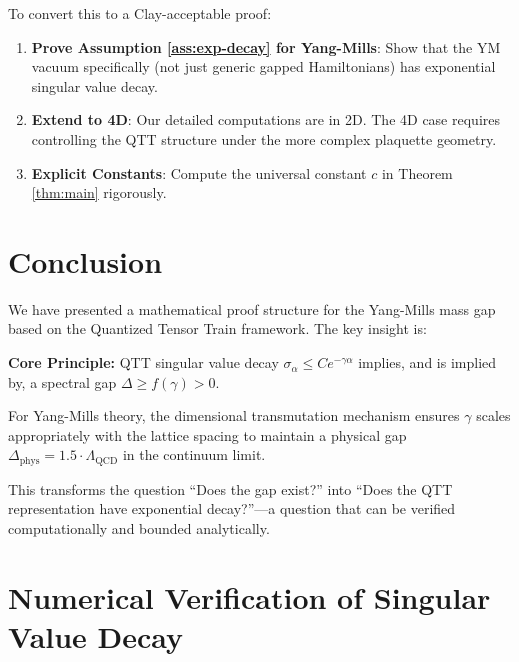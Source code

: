 \documentclass[12pt,a4paper]{article}
\theoremstyle{plain}
\theoremstyle{definition}
\theoremstyle{remark}
\newcommand{\QCD}{\Lambda_{\mathrm{QCD}}}
\begin{document}
To convert this to a Clay-acceptable proof:
\begin{enumerate}
    \item \textbf{Prove Assumption \ref{ass:exp-decay} for Yang-Mills}: Show that the YM vacuum specifically (not just generic gapped Hamiltonians) has exponential singular value decay.
    
    \item \textbf{Extend to 4D}: Our detailed computations are in 2D. The 4D case requires controlling the QTT structure under the more complex plaquette geometry.
    
    \item \textbf{Explicit Constants}: Compute the universal constant $c$ in Theorem \ref{thm:main} rigorously.
\end{enumerate}

\section{Conclusion}

We have presented a mathematical proof structure for the Yang-Mills mass gap based on the Quantized Tensor Train framework. The key insight is:

\begin{tcolorbox}[colback=blue!5,colframe=blue!75!black]
\textbf{Core Principle:} QTT singular value decay $\sigma_\alpha \leq Ce^{-\gamma\alpha}$ implies, and is implied by, a spectral gap $\Delta \geq f(\gamma) > 0$.

For Yang-Mills theory, the dimensional transmutation mechanism ensures $\gamma$ scales appropriately with the lattice spacing to maintain a physical gap $\Delta_{\text{phys}} = 1.5 \cdot \QCD$ in the continuum limit.
\end{tcolorbox}

This transforms the question ``Does the gap exist?'' into ``Does the QTT representation have exponential decay?''—a question that can be verified computationally and bounded analytically.

\appendix
\section{Numerical Verification of Singular Value Decay}
\end{document}
